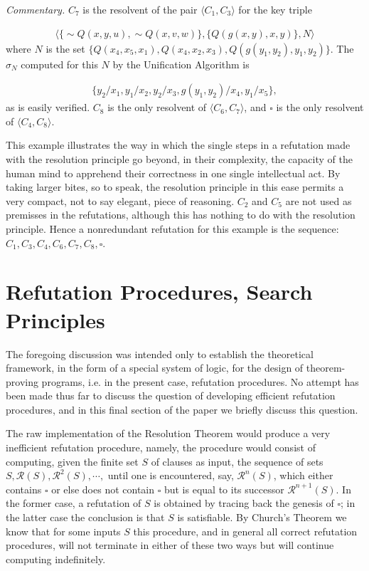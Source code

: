 \documentclass[8pt]{extarticle}
\begin{document}
\emph{Commentary.} $C_7$ is the resolvent of the pair $\langle C_1, C_3\rangle$ for the key triple

\begin{align*}
    \langle\{\sim Q(x,y,u), \sim Q(x,v,w)\}, \{ Q(g(x,y), x, y)\}, N\rangle
\end{align*}
\noindent
where $N$ is the set $\{Q(x_4, x_5, x_1), Q(x_4,x_2,x_3), Q(g(y_1,y_2),y_1,y_2)\}.$ The $\sigma_N$ computed for this $N$ by the Unification Algorithm is

\begin{align*}
    \{y_2/x_1, y_1/x_2, y_2/x_3, g(y_1, y_2)/x_4, y_1/x_5\},
\end{align*}
\noindent
as is easily verified. $C_8$ is the only resolvent of $\langle C_6, C_7\rangle$, and $\square$ is the only resolvent of $\langle C_4, C_8\rangle$.

This example illustrates the way in which the single steps in a refutation made with the resolution principle go beyond, in their complexity, the capacity of the human mind to apprehend their correctness in one single intellectual act. By taking larger bites, so to speak, the resolution principle in this ease permits a very compact, not to say elegant, piece of reasoning. $C_2$ and $C_5$ are not used as premisses in the refutations, although this has nothing to do with the resolution principle. Hence a nonredundant refutation for this example is the sequence: $C_1, C_3, C_4, C_6, C_7, C_8, \square$.

\newpage

\section{Refutation Procedures, Search Principles}

The foregoing discussion was intended only to establish the theoretical framework, in the form of a special system of logic, for the design of theorem-proving programs, i.e. in the present case, refutation procedures. No attempt has been made thus far to discuss the question of developing efficient refutation procedures, and in this final section of the paper we briefly discuss this question. 

The raw implementation of the Resolution Theorem would produce a very 
inefficient refutation procedure, namely, the procedure would consist of computing, given the finite set $S$ of clauses as input, the sequence of sets $S, \mathscr{R}(S), \mathscr{R}^2(S),\dotsm,$ until one is encountered, say, $\mathscr{R}^n(S)$, which either contains $\square$ or else does not contain $\square$ but is equal to its successor $\mathscr{R}^{n+1}(S)$. In the former case, a refutation of $S$ is obtained by tracing back the genesis of $\square$; in the latter case the conclusion is that $S$ is satisfiable. By Church's Theorem \cite{church_1936} we know that for some inputs $S$ this procedure, and in general all correct refutation procedures, will not terminate in either of these two ways but will continue computing indefinitely. 
\end{document}
